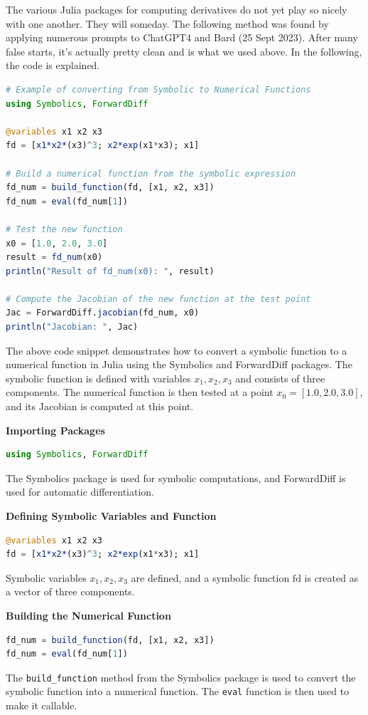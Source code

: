 The various Julia packages for computing derivatives do not yet play so nicely with one another. They will someday. The following method was found by applying numerous prompts to ChatGPT4 and Bard (25 Sept 2023). After many false starts, it's actually pretty clean and is what we used above. In the following, the code is explained.

\begin{lstlisting}[language=Julia,style=mystyle]
# Example of converting from Symbolic to Numerical Functions
using Symbolics, ForwardDiff

@variables x1 x2 x3
fd = [x1*x2*(x3)^3; x2*exp(x1*x3); x1]

# Build a numerical function from the symbolic expression
fd_num = build_function(fd, [x1, x2, x3])
fd_num = eval(fd_num[1])

# Test the new function
x0 = [1.0, 2.0, 3.0]
result = fd_num(x0)
println("Result of fd_num(x0): ", result)

# Compute the Jacobian of the new function at the test point
Jac = ForwardDiff.jacobian(fd_num, x0)
println("Jacobian: ", Jac)
\end{lstlisting}

The above code snippet demonstrates how to convert a symbolic function to a numerical function in Julia using the Symbolics and ForwardDiff packages. The symbolic function is defined with variables \(x_1, x_2, x_3\) and consists of three components. The numerical function is then tested at a point \(x_0 = [1.0, 2.0, 3.0]\), and its Jacobian is computed at this point.

\textbf{Importing Packages}
\begin{lstlisting}[language=Julia]
using Symbolics, ForwardDiff
\end{lstlisting}
The Symbolics package is used for symbolic computations, and ForwardDiff is used for automatic differentiation.

\textbf{Defining Symbolic Variables and Function}
\begin{lstlisting}[language=Julia]
@variables x1 x2 x3
fd = [x1*x2*(x3)^3; x2*exp(x1*x3); x1]
\end{lstlisting}
Symbolic variables \(x_1, x_2, x_3\) are defined, and a symbolic function \( \text{fd} \) is created as a vector of three components.

\textbf{Building the Numerical Function}
\begin{lstlisting}[language=Julia]
fd_num = build_function(fd, [x1, x2, x3])
fd_num = eval(fd_num[1])
\end{lstlisting}
The \texttt{build\_function} method from the Symbolics package is used to convert the symbolic function into a numerical function. The \texttt{eval} function is then used to make it callable.

